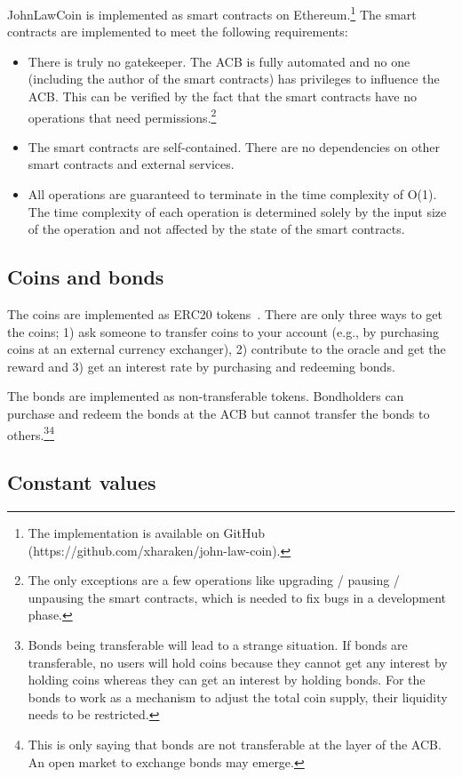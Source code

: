 \documentclass[dvipdfmx,a4paper]{article}
\begin{document}
JohnLawCoin is implemented as smart contracts on Ethereum.\footnote{The implementation is available on GitHub (https://github.com/xharaken/john-law-coin).} The smart contracts are implemented to meet the following requirements:

\begin{itemize}
\item There is truly no gatekeeper. The ACB is fully automated and no one (including the author of the smart contracts) has privileges to influence the ACB. This can be verified by the fact that the smart contracts have no operations that need permissions.\footnote{The only exceptions are a few operations like upgrading / pausing / unpausing the smart contracts, which is needed to fix bugs in a development phase.}
\item The smart contracts are self-contained. There are no dependencies on other smart contracts and external services.
\item All operations are guaranteed to terminate in the time complexity of O(1). The time complexity of each operation is determined solely by the input size of the operation and not affected by the state of the smart contracts.
\end{itemize}

\subsection{Coins and bonds}

The coins are implemented as ERC20 tokens~\cite{erc20token}. There are only three ways to get the coins; 1) ask someone to transfer coins to your account (e.g., by purchasing coins at an external currency exchanger), 2) contribute to the oracle and get the reward and 3) get an interest rate by purchasing and redeeming bonds.

The bonds are implemented as non-transferable tokens. Bondholders can purchase and redeem the bonds at the ACB but cannot transfer the bonds to others.\footnote{Bonds being transferable will lead to a strange situation. If bonds are transferable, no users will hold coins because they cannot get any interest by holding coins whereas they can get an interest by holding bonds. For the bonds to work as a mechanism to adjust the total coin supply, their liquidity needs to be restricted.}\footnote{This is only saying that bonds are not transferable at the layer of the ACB. An open market to exchange bonds may emerge.}

\subsection{Constant values}
\end{document}
